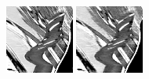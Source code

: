 \documentclass[10pt, journal, twocolumn, final, a4paper]{IEEEtran}
\begin{document}
\begin{figure}[thpb!]
\begin{center}
		\includegraphics[width=0.2\textwidth]{figs/temporal_slices/slice_mobile_mono_bm4d_s20_row220_col040-180_fra080-220.png}%
		\includegraphics[width=0.2\textwidth]{figs/temporal_slices/slice_mobile_mono_bm4d_s40_row220_col040-180_fra080-220.png}\\

\end{center}
\end{figure}
\end{document}

